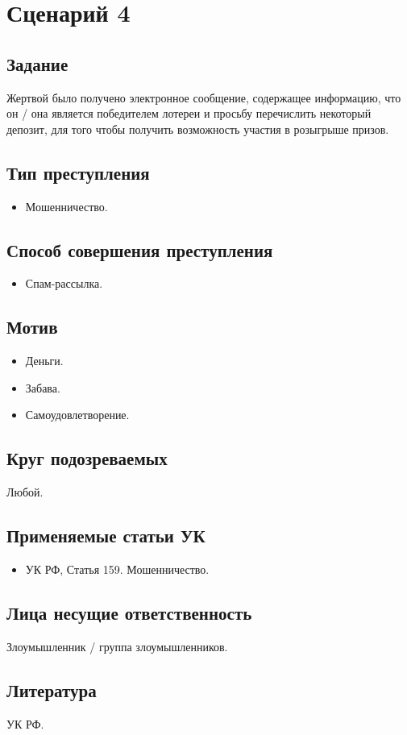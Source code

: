 \section*{Сценарий 4}

\subsection*{Задание}
Жертвой было получено электронное сообщение, содержащее информацию, что он /
она является победителем лотереи и просьбу перечислить некоторый депозит, для
того чтобы получить возможность участия в розыгрыше призов.

\subsection*{Тип преступления}
\begin{itemize}
  \item Мошенничество.
\end{itemize}

\subsection*{Способ совершения преступления}
\begin{itemize}
  \item Спам-рассылка.
\end{itemize}

\subsection*{Мотив}
\begin{itemize}
  \item Деньги.
  \item Забава.
  \item Самоудовлетворение.
\end{itemize}

\subsection*{Круг подозреваемых}
Любой.

\subsection*{Применяемые статьи УК}
\begin{itemize}
  \item УК РФ, Статья 159. Мошенничество.
\end{itemize}

\subsection*{Лица несущие ответственность}
Злоумышленник / группа злоумышленников.

\subsection*{Литература} УК РФ.
